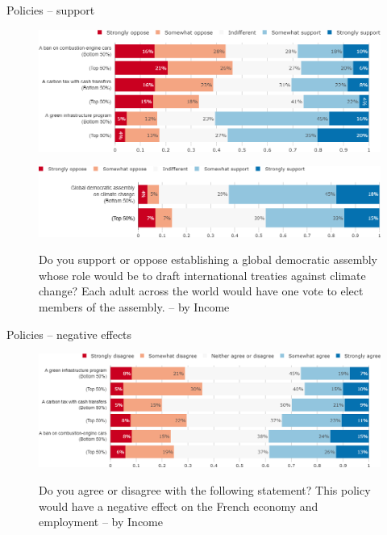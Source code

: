 \begin{framefont}{\small}
\begin{frame}{Policies – support}%
\vspace{-.5cm}
\begin{figure}[h!]
\caption{Do you support or oppose the following policy? -- by Income}
\includegraphics[width=.52\paperwidth]{../figures/FR/policies_support_FR_inc.png} \\
\vspace{.5cm}
\caption{Do you support or oppose establishing a global democratic assembly whose role would be to draft international treaties against climate change? Each adult across the world would have one vote to elect members of the assembly. -- by Income}
\includegraphics[width=.52\paperwidth]{../figures/FR/global_assembly_support_FR_inc.png} \\
\end{figure}
\end{frame}

\begin{frame}{Policies – negative effects}%
\vspace{-.5cm}
\begin{figure}[h!]
\caption{Do you agree or disagree with the following statement? This policy would have a negative effect on the French economy and employment -- by Income}
\includegraphics[width=.7\paperwidth]{../figures/FR/policies_negative_effect_FR_inc.png} \\
\end{figure}
\end{frame}



\end{framefont}

